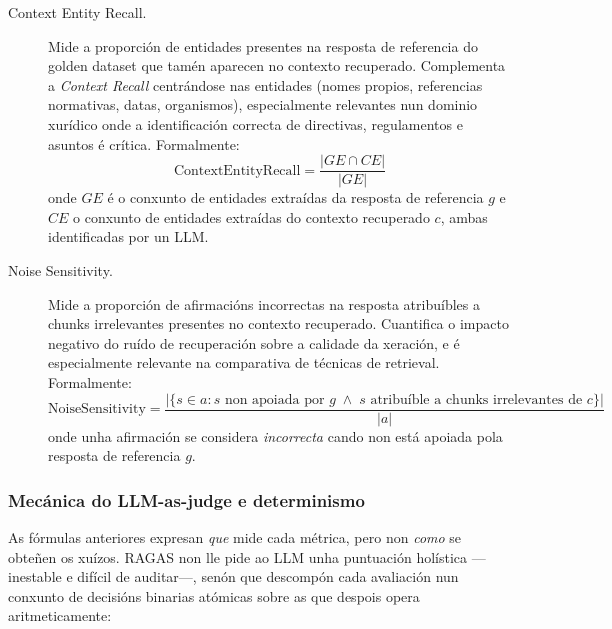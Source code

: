 \documentclass[11pt, a4paper, oneside]{report}
\begin{document}
\begin{description}
  \item[Context Entity Recall.] Mide a proporción de entidades presentes na resposta de
    referencia do golden dataset que tamén aparecen no contexto recuperado. Complementa
    a \textit{Context Recall} centrándose nas entidades (nomes propios, referencias
    normativas, datas, organismos), especialmente relevantes nun dominio xurídico onde
    a identificación correcta de directivas, regulamentos e asuntos é crítica.
    Formalmente:
    \begin{equation}
      \text{ContextEntityRecall} = \frac{|GE \cap CE|}{|GE|}
      \label{eq:context_entity_recall}
    \end{equation}
    onde $GE$ é o conxunto de entidades extraídas da resposta de referencia $g$ e $CE$
    o conxunto de entidades extraídas do contexto recuperado $c$, ambas identificadas
    por un LLM.

  \item[Noise Sensitivity.] Mide a proporción de afirmacións incorrectas na resposta
    atribuíbles a chunks irrelevantes presentes no contexto recuperado. Cuantifica o
    impacto negativo do ruído de recuperación sobre a calidade da xeración, e é
    especialmente relevante na comparativa de técnicas de retrieval. Formalmente:
    \begin{equation}
      \text{NoiseSensitivity} = \frac{|\{s \in a : s \text{ non apoiada por } g \;\land\; s \text{ atribuíble a chunks irrelevantes de } c\}|}{|a|}
      \label{eq:noise_sensitivity}
    \end{equation}
    onde unha afirmación se considera \textit{incorrecta} cando non está apoiada pola
    resposta de referencia $g$.
\end{description}

\subsubsection{Mecánica do LLM-as-judge e determinismo}
\label{sec:llm_judge_mecanica}

As fórmulas anteriores expresan \emph{que} mide cada métrica, pero non \emph{como} se
obteñen os xuízos. RAGAS non lle pide ao LLM unha puntuación holística —inestable e
difícil de auditar—, senón que descompón cada avaliación nun conxunto de decisións
binarias atómicas sobre as que despois opera aritmeticamente:
\end{document}
